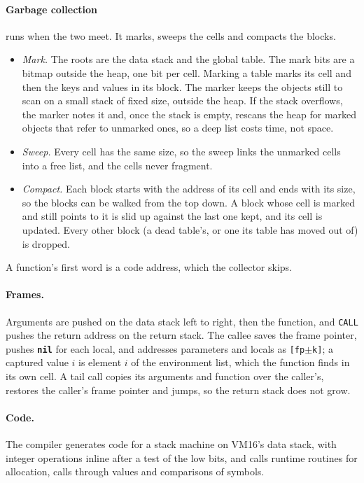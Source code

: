 \documentclass[11pt,a4paper]{article}
\newcommand{\kw}[1]{\textbf{\texttt{#1}}}
\newcommand{\vm}{VM16}
\newcommand{\op}[1]{\texttt{#1}}
\begin{document}
\paragraph{Garbage collection} runs when the two meet. It marks, sweeps the
cells and compacts the blocks.
\begin{itemize}[nosep]
\item \emph{Mark.} The roots are the data stack and the global table. The
  mark bits are a bitmap outside the heap, one bit per cell. Marking a table
  marks its cell and then the keys and values in its block. The marker
  keeps the objects still to scan on a small stack of fixed size, outside
  the heap. If the stack overflows, the marker notes it and, once the stack
  is empty, rescans the heap for marked objects that refer to unmarked
  ones, so a deep list costs time, not space.
\item \emph{Sweep.} Every cell has the same size, so the sweep links the
  unmarked cells into a free list, and the cells never fragment.
\item \emph{Compact.} Each block starts with the address of its cell and
  ends with its size, so the blocks can be walked from the top down. A
  block whose cell is marked and still
  points to it is slid up against the last one kept, and its cell is
  updated. Every other block (a dead table's, or one its table has moved out
  of) is dropped.
\end{itemize}
A function's first word is a code address, which the collector skips.

\paragraph{Frames.} Arguments are pushed on the data stack left to right,
then the function, and \op{CALL} pushes the return address on the return
stack. The callee saves the frame pointer, pushes \kw{nil} for each local,
and addresses parameters and locals as \texttt{[fp$\pm$k]}; a captured value
$i$ is element $i$ of the environment list, which the function finds in its
own cell. A tail call copies its arguments and function over the caller's,
restores the caller's frame pointer and jumps, so the return stack does not
grow.

\paragraph{Code.} The compiler generates code for a stack machine on
\vm{}'s data stack, with integer operations inline after a test of the low
bits, and calls runtime routines for allocation, calls through values and
comparisons of symbols.
\end{document}
